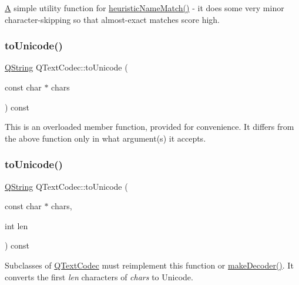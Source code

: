 \mbox{\hyperlink{class_a}{A}} simple utility function for \mbox{\hyperlink{class_q_text_codec_a1bcf2f11fac6113fd6ae74dda55b2ca4}{heuristic\+Name\+Match()}} -\/ it does some very minor character-\/skipping so that almost-\/exact matches score high. \mbox{\label{class_q_text_codec_ae7f9ae7d3a759d49e050676d4cb69fdc}} 
\subsubsection{\texorpdfstring{toUnicode()}{toUnicode()}\hspace{0.1cm}{\footnotesize\ttfamily [1/4]}}
{\footnotesize\ttfamily \mbox{\hyperlink{class_q_string}{Q\+String}} Q\+Text\+Codec\+::to\+Unicode (\begin{DoxyParamCaption}\item[{const char $\ast$}]{chars }\end{DoxyParamCaption}) const}

This is an overloaded member function, provided for convenience. It differs from the above function only in what argument(s) it accepts.\mbox{\label{class_q_text_codec_aafe2c454ae7cbbf3d84a7ca26f775c49}} 
\subsubsection{\texorpdfstring{toUnicode()}{toUnicode()}\hspace{0.1cm}{\footnotesize\ttfamily [2/4]}}
{\footnotesize\ttfamily \mbox{\hyperlink{class_q_string}{Q\+String}} Q\+Text\+Codec\+::to\+Unicode (\begin{DoxyParamCaption}\item[{const char $\ast$}]{chars,  }\item[{int}]{len }\end{DoxyParamCaption}) const\hspace{0.3cm}{\ttfamily [virtual]}}

Subclasses of \mbox{\hyperlink{class_q_text_codec}{Q\+Text\+Codec}} must reimplement this function or \mbox{\hyperlink{class_q_text_codec_abb65882aa316a2ad49a10e9f86c4dc88}{make\+Decoder()}}. It converts the first {\itshape len} characters of {\itshape chars} to Unicode.

